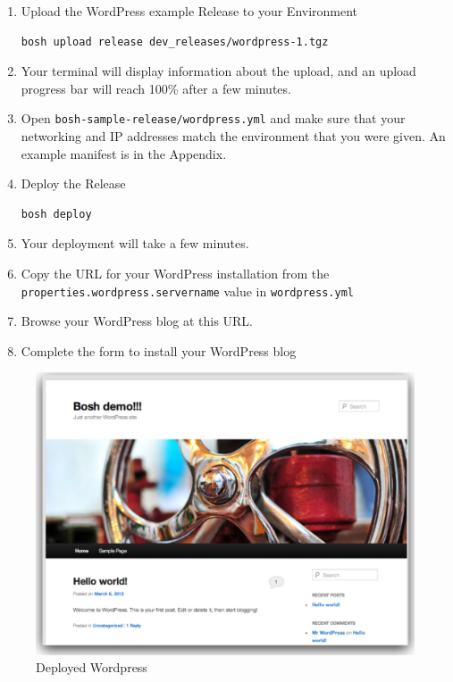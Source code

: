 \begin{enumerate}
\item Upload the WordPress example Release to your Environment

\begin{verbatim}
bosh upload release dev_releases/wordpress-1.tgz
\end{verbatim}


\item Your terminal will display information about the upload, and an upload progress bar will reach 100\% after a few minutes.

\item Open \texttt{bosh-sample-release\slash wordpress.yml} and make sure that your networking and IP addresses match the environment that you were given. An example manifest is in the Appendix.

\item Deploy the Release

\begin{verbatim}
bosh deploy
\end{verbatim}


\item Your deployment will take a few minutes.

\item Copy the URL for your WordPress installation from the \texttt{properties.wordpress.servername} value in \texttt{wordpress.yml}

\item Browse your WordPress blog at this URL.

\item Complete the form to install your WordPress blog

\end{enumerate}

\begin{figure}[htbp]
\centering
\includegraphics[keepaspectratio,width=\textwidth,height=0.75\textheight]{deployed.pdf}
\caption{Deployed Wordpress}
\label{}
\end{figure}



